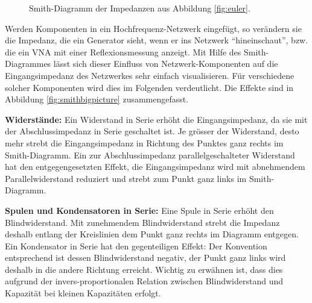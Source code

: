 \documentclass[twoside,a4paper,11pt,halfparskip,DIV=11,notitlepage]{scrartcl}
\newcommand{\Ohm}{$\Omega$\xspace}
\begin{document}
\begin{figure}
    \caption{Smith-Diagramm der Impedanzen aus Abbildung \ref{fig:euler}.}
    \label{fig:smithimpedance}
\end{figure}

Werden Komponenten in ein Hochfrequenz-Netzwerk eingefügt, so verändern sie die Impedanz, die ein Generator sieht,
wenn er ins Netzwerk ``hineinschaut'', bzw. die ein VNA mit einer Reflexionsmessung anzeigt. Mit Hilfe des
Smith-Diagrammes lässt sich dieser Einfluss von Netzwerk-Komponenten auf die Eingangsimpedanz des Netzwerkes
sehr einfach visualisieren. Für verschiedene solcher Komponenten wird dies im Folgenden verdeutlicht. Die
Effekte sind in Abbildung \ref{fig:smithbigpicture} zusammengefasst.

\newpage %

\textbf{Widerstände:} Ein Widerstand in Serie erhöht die Eingangsimpedanz, da sie mit der Abschlussimpedanz
in Serie geschaltet ist. Je grösser der Widerstand, desto mehr strebt die Eingangsimpedanz in Richtung des
Punktes ganz rechts im Smith-Diagramm. Ein zur Abschlussimpedanz parallelgeschalteter Widerstand hat den
entgegengesetzten Effekt, die Eingangsimpedanz wird mit abnehmendem
Parallelwiderstand reduziert und strebt zum Punkt ganz links im Smith-Diagramm.

\textbf{Spulen und Kondensatoren in Serie:} Eine Spule in Serie erhöht den Blindwiderstand. Mit zunehmendem
Blindwiderstand strebt die Impedanz deshalb entlang der Kreislinien dem Punkt ganz rechts im Diagramm entgegen.
Ein Kondensator in Serie hat den gegenteiligen Effekt: Der Konvention entsprechend ist dessen Blindwiderstand
negativ, der Punkt ganz links wird deshalb in die andere Richtung erreicht. Wichtig zu erwähnen ist, dass dies
aufgrund der invers-proportionalen Relation zwischen Blindwiderstand und Kapazität bei kleinen Kapazitäten erfolgt.
\end{document}
